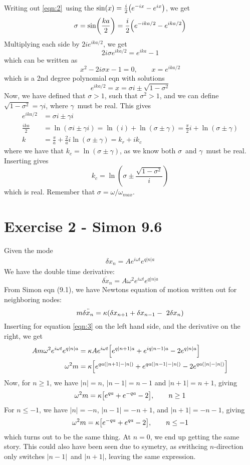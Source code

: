 \documentclass[12p,a4paper]{article}
\renewcommand{\exp}{e^}
\renewcommand{\exp}{e^}
\begin{document}
Writing out \ref{eqn:2} using the $\sin(x) = \frac{i}{2}\qty(\exp{-ix} - \exp{ix})$, we get
\[
    \sigma = \sin(\frac{ka}{2}) = \frac{i}{2}\qty(\exp{-ika/2} - \exp{ika/2})
\]
Multiplying each side by $2i\exp{ika/2}$, we get
\[
    2i\sigma\exp{ika/2} =  \exp{ika} - 1
\]
which can be written as 
\[
    x^2 - 2i\sigma x - 1 = 0, \quad\quad  x = \exp{ika/2}
\]
which is a 2nd degree polynomial eqn with solutions
\[
    \exp{ika/2} = x = \sigma i \pm \sqrt{1- \sigma^2}
\]
Now, we have defined that $\sigma > 1$, such that $\sigma^2 > 1$, and we can define $\sqrt{1-\sigma^2} = \gamma i$, where $\gamma$ must be real. This gives
\begin{align*}
    \exp{ika/2} &= \sigma i \pm \gamma i \\
    \frac{ika}{2} &= \ln(\sigma i \pm \gamma i) = \ln(i) + \ln(\sigma \pm \gamma) = \frac{\pi}{2}i + \ln(\sigma \pm \gamma) \\
    k &= \frac{\pi}{a} + \frac{2}{a}i \ln(\sigma \pm \gamma) = k_r + i k_c
\end{align*}
where we have that $k_c = \ln(\sigma \pm \gamma)$, as we know both $\sigma$ and $\gamma$ must be real.
Inserting gives
\[
    k_c = \ln(\sigma \pm \frac{\sqrt{1-\sigma^2}}{i})
\]
which is real. Remember that $\sigma = \omega/\omega_{max}$.


\section*{Exercise 2 - Simon 9.6}
Given the mode
\begin{align}\label{eqn:3}
    \delta x_n = A\exp{i\omega t}\exp{q|n|a}
\end{align}
We have the double time derivative:
\[
    \ddot{\delta x_n} = A\omega^2\exp{i\omega t}\exp{q|n|a}
\]
From Simon eqn (9.1), we have Newtons equation of motion written out for neighboring nodes:
\[
    m \ddot{\delta x_n} = \kappa\qty(\delta x_{n+1} + \delta x_{n-1} - 2\delta x_n)
\]
Inserting for equation \ref{eqn:3} on the left hand side, and the derivative on the right, we get
\begin{align*}
    Am\omega^2\exp{i\omega t}\exp{q|n|a} &= \kappa A\exp{i\omega t}\qty[\exp{q|n+1|a} + \exp{iq|n-1|a} - 2\exp{q|n|a}] \\
    \omega^2m &= \kappa\qty[\exp{qa(|n+1|-|n|)} + \exp{qa(|n-1|-|n|)} - 2\exp{qa(|n|-|n|)}] 
\end{align*}
Now, for $n \geq 1$, we have $|n| = n$, $|n-1| = n-1$ and $|n+1| = n+1$, giving
\[
    \omega^2m = \kappa\qty[\exp{qa} + \exp{-qa} - 2], \quad\quad n \geq 1
\]
For $n \leq -1$, we have $|n| = -n$, $|n-1| = -n+1$, and $|n+1| = -n-1$, giving
\[
    \omega^2m = \kappa\qty[\exp{-qa} + \exp{qa} - 2], \quad\quad n \leq -1
\]
which turns out to be the same thing.
At $n=0$, we end up getting the same story. This could also have been seen due to symetry, as swithcing $n$-direction only switches $|n-1|$ and $|n+1|$, leaving the same expression.
\end{document}
